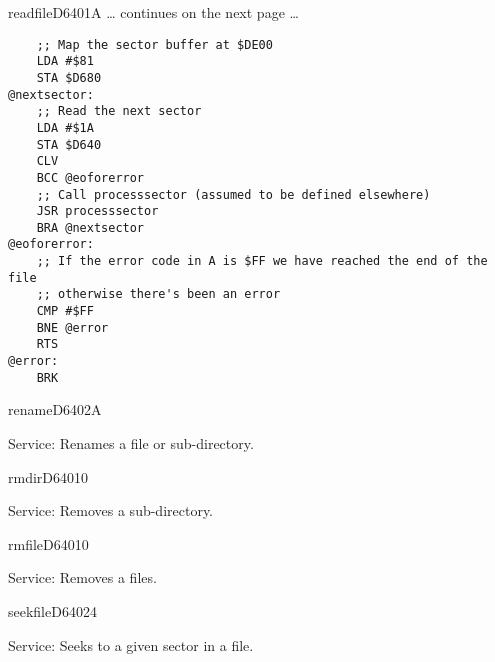\begin{hyppotrap}{readfile}{D640}{1A}
\ldots{} continues on the next page \ldots

\begin{tcolorbox}[colback=black,coltext=white]
\verbatimfont{\codefont}
\begin{verbatim}
    ;; Map the sector buffer at $DE00
    LDA #$81
    STA $D680
@nextsector:
    ;; Read the next sector
    LDA #$1A
    STA $D640
    CLV
    BCC @eoforerror
    ;; Call processsector (assumed to be defined elsewhere)
    JSR processsector
    BRA @nextsector
@eoforerror:
    ;; If the error code in A is $FF we have reached the end of the file
    ;; otherwise there's been an error
    CMP #$FF
    BNE @error
    RTS
@error:
    BRK
\end{verbatim}
\end{tcolorbox}
\end{hyppotrap}


\newpage
\begin{hyppotrap}{rename}{D640}{2A}
\item [Service:]
  Renames a file or sub-directory.
\notimplemented
\end{hyppotrap}


\begin{hyppotrap}{rmdir}{D640}{10}
\item [Service:]
  Removes a sub-directory.
\notimplemented
\end{hyppotrap}


\begin{hyppotrap}{rmfile}{D640}{10}
\item [Service:]
  Removes a files.
\notimplemented
\end{hyppotrap}


\begin{hyppotrap}{seekfile}{D640}{24}
\item [Service:]
  Seeks to a given sector in a file.
\notimplemented
\end{hyppotrap}


